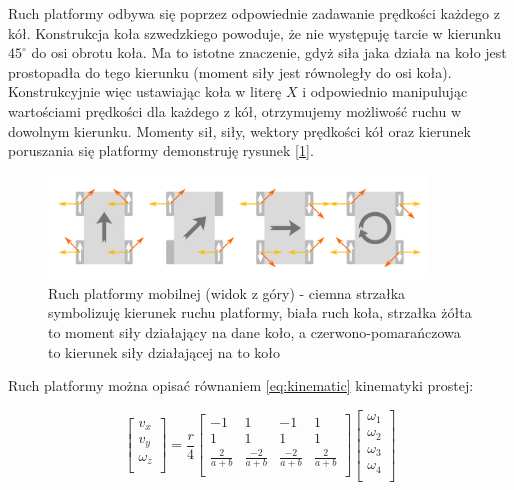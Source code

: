 Ruch platformy odbywa się poprzez odpowiednie zadawanie prędkości każdego z kół. Konstrukcja koła szwedzkiego powoduje, że nie występuję tarcie w kierunku $45^{\circ}$ do osi obrotu koła. Ma to istotne znaczenie, gdyż siła jaka działa na koło jest prostopadła do tego kierunku (moment siły jest równoległy do osi koła). Konstrukcyjnie więc ustawiając koła w literę $X$ i odpowiednio manipulując wartościami prędkości dla każdego z kół, otrzymujemy możliwość ruchu w dowolnym kierunku. Momenty sił, siły, wektory prędkości kół oraz kierunek poruszania się platformy demonstruję rysunek [\ref{fig:vectors}].

\begin{figure}[H]
	\centering
	\includegraphics[width=0.9\textwidth]{gfx/vectors.png}
	\caption{Ruch platformy mobilnej (widok z góry) - ciemna strzałka symbolizuję kierunek ruchu platformy, biała ruch koła, strzałka żółta to moment siły działający na dane koło, a czerwono-pomarańczowa to kierunek siły działającej na to koło \cite{omnivelma}}
	\label{fig:vectors}
\end{figure}

Ruch platformy można opisać równaniem \eqref{eq:kinematic} kinematyki prostej:

\begin{equation} \label{eq:kinematic}
	\begin{bmatrix}
	v_x \\
	v_y \\
	\omega_z \\
	\end{bmatrix}
	=
	\frac{r}{4}
	\begin{bmatrix}
	-1 & 1 & -1 & 1 \\
	1 & 1 & 1 & 1 \\
	\frac{2}{a+b} & \frac{-2}{a+b} & \frac{-2}{a+b} & \frac{2}{a+b} \\
	\end{bmatrix}
	\begin{bmatrix}
	\omega_1 \\
	\omega_2 \\
	\omega_3 \\
	\omega_4 \\
	\end{bmatrix}
\end{equation} 

